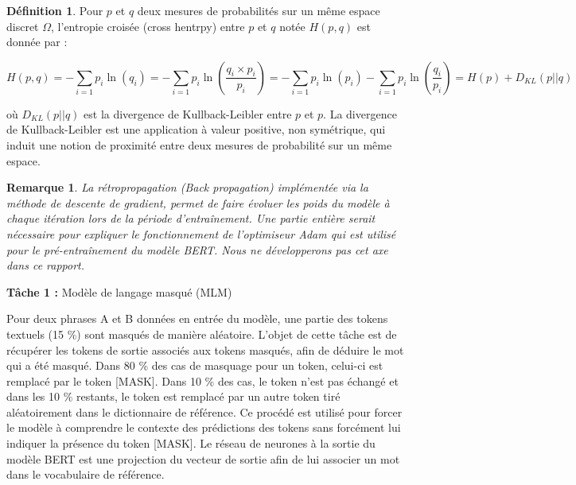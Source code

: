 \documentclass[12pt]{article}
\newtheorem{rmq}{Remarque}
\theoremstyle{definition}
\newtheorem{defi}{Définition}
\begin{document}
\begin{defi}
	Pour $p$ et $q$ deux mesures de probabilités sur un même espace discret $\Omega$, l'entropie croisée (cross hentrpy) entre $p$ et $q$ notée $H(p,q)$ est donnée par :
	
	$$H(p,q) = - \sum_{i=1}p_i\ln(q_i) = - \sum_{i=1}p_i\ln\left(\dfrac{q_i\times p_i}{p_i}\right) = - \sum_{i=1}p_i\ln(p_i) - \sum_{i=1}p_i\ln\left(\dfrac{q_i}{p_i}\right) = H(p) + D_{KL}\left(p||q\right) $$
	
	où $D_{KL}(p||q)$ est la divergence de Kullback-Leibler entre $p$ et $p$. La divergence de Kullback-Leibler est une application à valeur positive, non symétrique, qui induit une notion de proximité entre deux mesures de probabilité sur un même espace. 
\end{defi} 

\begin{rmq}
	
	La rétropropagation (Back propagation) implémentée via la méthode de descente de gradient, permet de faire évoluer les poids du modèle à chaque itération lors de la période d'entraînement. Une partie entière serait nécessaire pour expliquer le fonctionnement de l'optimiseur Adam qui est utilisé pour le pré-entraînement du modèle BERT. Nous ne développerons pas cet axe dans ce rapport.
	
\end{rmq}


\textbf{Tâche 1 :} Modèle de langage masqué (MLM)

Pour deux phrases A et B données en entrée du modèle, une partie des tokens textuels (15 \%) sont masqués de manière aléatoire. L’objet de cette tâche est de récupérer les tokens de sortie associés aux tokens masqués, afin de déduire le mot qui a été masqué. Dans 80 \% des cas de masquage pour un token, celui-ci est remplacé par le token [MASK]. Dans 10 \% des cas, le token n’est pas échangé et dans les 10 \% restants, le token est remplacé par un autre token tiré aléatoirement dans le dictionnaire de référence. Ce procédé est utilisé pour forcer le modèle à comprendre le contexte des prédictions des tokens sans forcément lui indiquer la présence du token [MASK]. Le réseau de neurones à la sortie du modèle BERT est une projection du vecteur de sortie afin de lui associer un mot dans le vocabulaire de référence.
\end{document}
